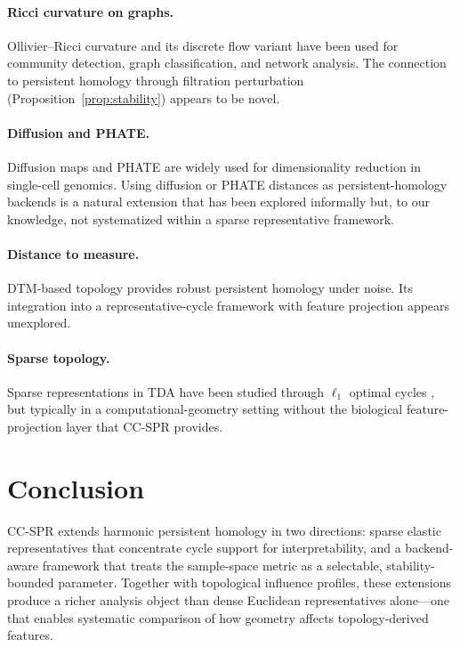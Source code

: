 \documentclass[11pt]{article}
\begin{document}
\paragraph{Ricci curvature on graphs.}
Ollivier--Ricci curvature \cite{ollivier2007, ollivier2009} and its discrete flow variant \cite{ni2019community} have been used for community detection, graph classification, and network analysis.
The connection to persistent homology through filtration perturbation (Proposition~\ref{prop:stability}) appears to be novel.

\paragraph{Diffusion and PHATE.}
Diffusion maps \cite{coifman2006diffusion} and PHATE \cite{moon2019phate} are widely used for dimensionality reduction in single-cell genomics.
Using diffusion or PHATE distances as persistent-homology backends is a natural extension that has been explored informally but, to our knowledge, not systematized within a sparse representative framework.

\paragraph{Distance to measure.}
DTM-based topology \cite{chazal2011dtm, chazal2017robust} provides robust persistent homology under noise.
Its integration into a representative-cycle framework with feature projection appears unexplored.

\paragraph{Sparse topology.}
Sparse representations in TDA have been studied through $\ell_1$ optimal cycles \cite{chen2011hardness, dey2011optimal}, but typically in a computational-geometry setting without the biological feature-projection layer that CC-SPR provides.

\section{Conclusion}
\label{sec:conclusion}

CC-SPR extends harmonic persistent homology in two directions: sparse elastic representatives that concentrate cycle support for interpretability, and a backend-aware framework that treats the sample-space metric as a selectable, stability-bounded parameter.
Together with topological influence profiles, these extensions produce a richer analysis object than dense Euclidean representatives alone---one that enables systematic comparison of how geometry affects topology-derived features.
\end{document}
